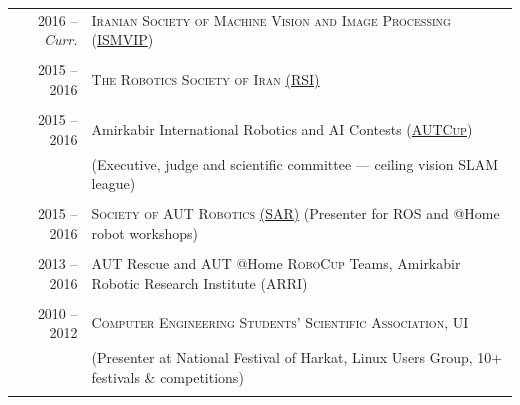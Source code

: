 

\vspace{2mm}


\begin{tabular}{rl}

  \textsc{2016} -- \emph{Curr.} &
  \textsc{Iranian Society of Machine Vision and Image Processing}
  (\href{http://www.ismvip.ir/en/}{\textsc{ISMVIP}})
  \\ \vspace{-2mm} \\

  \textsc{2015 -- 2016} &
  \textsc{The Robotics Society of Iran} \href{http://rsiran.ir/}{(RSI)}
  \\ \vspace{-2mm} \\

  \textsc{2015 -- 2016} &
  Amirkabir International Robotics and AI Contests
  (\href{http://autcup.aut.ac.ir/}{\textsc{AUTCup}}) \\
  & \footnotesize (Executive, judge and scientific committee — ceiling vision SLAM league)
  \\ \vspace{-2mm} \\

  \textsc{2015 -- 2016} &
  \textsc{Society of AUT Robotics} \href{http://sar.aut.ac.ir/en/}{(SAR)}
  \footnotesize (Presenter for ROS and @Home robot workshops)
  \\ \vspace{-2mm} \\

  \textsc{2013 -- 2016} &
  AUT Rescue and AUT @Home \textsc{RoboCup} Teams,
  Amirkabir Robotic Research Institute (ARRI)
  \\ \vspace{-2mm} \\

  \textsc{2010 -- 2012} &
  \textsc{Computer Engineering Students' Scientific Association}, UI \\
  & \footnotesize (Presenter at National Festival of Harkat, Linux Users Group, 10+ festivals \& competitions)
  \\ \vspace{-2mm} \\


\end{tabular}
